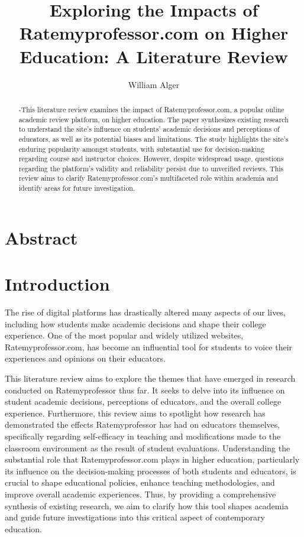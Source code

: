 \documentclass[doc, 12pt, twocolumn]{apa7}
\title{Exploring the Impacts of Ratemyprofessor.com on Higher Education: A Literature Review}
\author{William Alger}
\affiliation{Northern Kentucky University}
\begin{document}
\maketitle

\section{Abstract}
\begin{abstract}
-This literature review examines the impact of Ratemyprofessor.com, a popular online academic review platform, on higher education. The paper synthesizes existing research to understand the site's influence on students' academic decisions and perceptions of educators, as well as its potential biases and limitations. The study highlights the site's enduring popularity amongst students, with substantial use for decision-making regarding course and instructor choices. However, despite widespread usage, questions regarding the platform's validity and reliability persist due to unverified reviews. This review aims to clarify Ratemyprofessor.com's multifaceted role within academia and identify areas for future investigation.
\end{abstract}

\section{Introduction}
The rise of digital platforms has drastically altered many aspects of our lives, including how students make academic decisions and shape their college experience. One of the most popular and widely utilized websites, Ratemyprofessor.com, has become an influential tool for students to voice their experiences and opinions on their educators.

This literature review aims to explore the themes that have emerged in research conducted on Ratemyprofessor thus far. It seeks to delve into its influence on student academic decisions, perceptions of educators, and the overall college experience. Furthermore, this review aims to spotlight how research has demonstrated the effects Ratemyprofessor has had on educators themselves, specifically regarding self-efficacy in teaching and modifications made to the classroom environment as the result of student evaluations. Understanding the substantial role that Ratemyprofessor.com plays in higher education, particularly its influence on the decision-making processes of both students and educators, is crucial to shape educational policies, enhance teaching methodologies, and improve overall academic experiences. Thus, by providing a comprehensive synthesis of existing research, we aim to clarify how this tool shapes academia and guide future investigations into this critical aspect of contemporary education.
\end{document}
